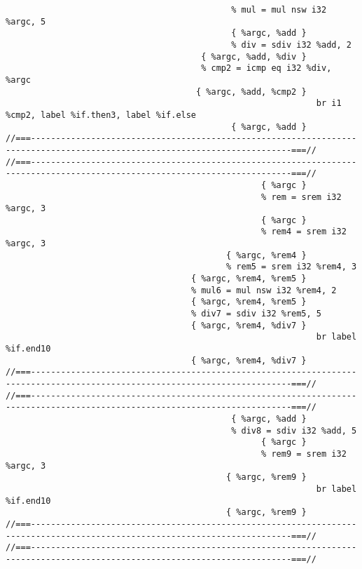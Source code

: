 \begin{verbatim}
                                             % mul = mul nsw i32 %argc, 5
                                             { %argc, %add }
                                             % div = sdiv i32 %add, 2
                                       { %argc, %add, %div }
                                       % cmp2 = icmp eq i32 %div, %argc
                                      { %argc, %add, %cmp2 }
                                                              br i1 %cmp2, label %if.then3, label %if.else
                                             { %argc, %add }
//===--------------------------------------------------------------------------------------------------------------------------===//
//===--------------------------------------------------------------------------------------------------------------------------===//
                                                   { %argc }
                                                   % rem = srem i32 %argc, 3
                                                   { %argc }
                                                   % rem4 = srem i32 %argc, 3
                                            { %argc, %rem4 }
                                            % rem5 = srem i32 %rem4, 3
                                     { %argc, %rem4, %rem5 }
                                     % mul6 = mul nsw i32 %rem4, 2
                                     { %argc, %rem4, %rem5 }
                                     % div7 = sdiv i32 %rem5, 5
                                     { %argc, %rem4, %div7 }
                                                              br label %if.end10
                                     { %argc, %rem4, %div7 }
//===--------------------------------------------------------------------------------------------------------------------------===//
//===--------------------------------------------------------------------------------------------------------------------------===//
                                             { %argc, %add }
                                             % div8 = sdiv i32 %add, 5
                                                   { %argc }
                                                   % rem9 = srem i32 %argc, 3
                                            { %argc, %rem9 }
                                                              br label %if.end10
                                            { %argc, %rem9 }
//===--------------------------------------------------------------------------------------------------------------------------===//
//===--------------------------------------------------------------------------------------------------------------------------===//

\end{verbatim}
